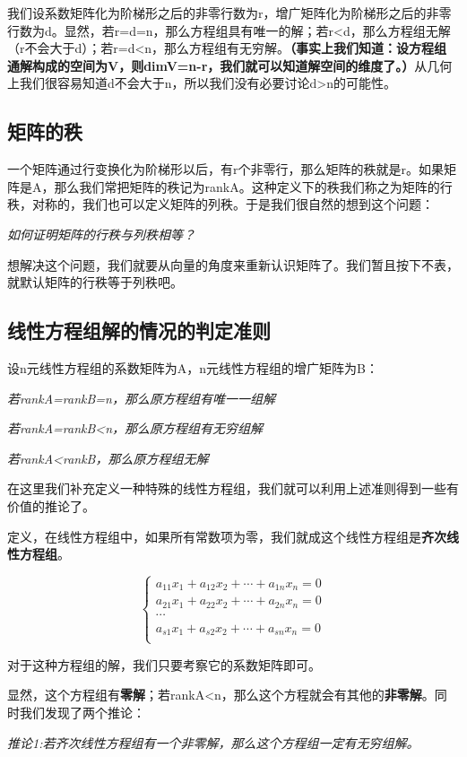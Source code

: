 \documentclass[a4paper]{ctexart}
\begin{document}
我们设系数矩阵化为阶梯形之后的非零行数为r，增广矩阵化为阶梯形之后的非零行数为d。显然，若r=d=n，那么方程组具有唯一的解；若r<d，那么方程组无解（r不会大于d）；若r=d<n，那么方程组有无穷解。\textbf{（事实上我们知道：设方程组通解构成的空间为V，则dimV=n-r，我们就可以知道解空间的维度了。）}从几何上我们很容易知道d不会大于n，所以我们没有必要讨论d>n的可能性。

\subsection{矩阵的秩}
一个矩阵通过行变换化为阶梯形以后，有r个非零行，那么矩阵的秩就是r。如果矩阵是A，那么我们常把矩阵的秩记为rankA。这种定义下的秩我们称之为矩阵的行秩，对称的，我们也可以定义矩阵的列秩。于是我们很自然的想到这个问题：

\textit{如何证明矩阵的行秩与列秩相等？}

想解决这个问题，我们就要从向量的角度来重新认识矩阵了。我们暂且按下不表，就默认矩阵的行秩等于列秩吧。

\subsection{线性方程组解的情况的判定准则}
设n元线性方程组的系数矩阵为A，n元线性方程组的增广矩阵为B：

\textit{若rankA=rankB=n，那么原方程组有唯一一组解}

\textit{若rankA=rankB<n，那么原方程组有无穷组解}

\textit{若rankA<rankB，那么原方程组无解}

在这里我们补充定义一种特殊的线性方程组，我们就可以利用上述准则得到一些有价值的推论了。

定义，在线性方程组中，如果所有常数项为零，我们就成这个线性方程组是\textbf{齐次线性方程组}。

$$
\begin{cases}
a_{11}x_{1}+a_{12}x_{2}+\cdots+a_{1n}x_{n}=0\\
a_{21}x_{1}+a_{22}x_{2}+\cdots+a_{2n}x_{n}=0\\
\cdots\\
a_{s1}x_{1}+a_{s2}x_{2}+\cdots+a_{sn}x_{n}=0\\
\end{cases}
$$

对于这种方程组的解，我们只要考察它的系数矩阵即可。

显然，这个方程组有\textbf{零解}；若rankA<n，那么这个方程就会有其他的\textbf{非零解}。同时我们发现了两个推论：

\textit{推论1:若齐次线性方程组有一个非零解，那么这个方程组一定有无穷组解。}
\end{document}
